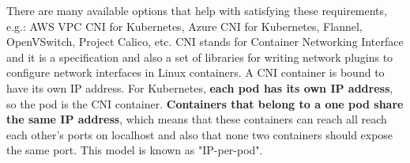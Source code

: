 There are many available options that help with satisfying these requirements, e.g.: AWS VPC CNI for Kubernetes, Azure CNI for Kubernetes, Flannel, OpenVSwitch, Project Calico, etc\cite{k8s-net}. CNI stands for Container Networking Interface and it is a specification and also a set of libraries for writing network plugins to configure network interfaces in Linux containers. A CNI container is bound to have its own IP address. For Kubernetes, \textbf{each pod has its own IP address}, so the pod is the CNI container\cite{book-mastering-k8s}. \textbf{Containers that belong to a one pod share the same IP address}, which means that these containers can reach all reach each other’s ports on localhost and also that none two containers should expose the same port. This model is known as "IP-per-pod"\cite{k8s-net}.
